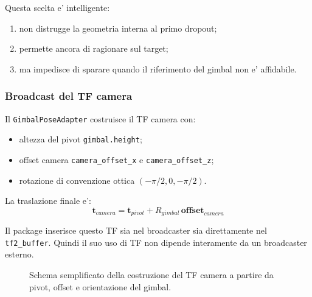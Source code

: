 \documentclass[11pt,a4paper]{article}
\newcommand{\code}[1]{\texttt{#1}}
\begin{document}
Questa scelta e' intelligente:
\begin{enumerate}[leftmargin=1.4em]
  \item non distrugge la geometria interna al primo dropout;
  \item permette ancora di ragionare sul target;
  \item ma impedisce di sparare quando il riferimento del gimbal non e' affidabile.
\end{enumerate}

\subsubsection{Broadcast del TF camera}

Il \code{GimbalPoseAdapter} costruisce il TF camera con:
\begin{itemize}[leftmargin=1.4em]
  \item altezza del pivot \code{gimbal.height};
  \item offset camera \code{camera\_offset\_x} e \code{camera\_offset\_z};
  \item rotazione di convenzione ottica \((-\pi/2, 0, -\pi/2)\).
\end{itemize}

La traslazione finale e':
\begin{equation}
  \mathbf{t}_{camera} = \mathbf{t}_{pivot} + R_{gimbal} \, \mathbf{offset}_{camera}
\end{equation}

Il package inserisce questo TF sia nel broadcaster sia direttamente nel \code{tf2\_buffer}. Quindi il suo uso di TF non dipende interamente da un broadcaster esterno.

\begin{figure}[ht]
\centering
{}
\caption{Schema semplificato della costruzione del TF camera a partire da pivot, offset e orientazione del gimbal.}
\end{figure}
\end{document}
